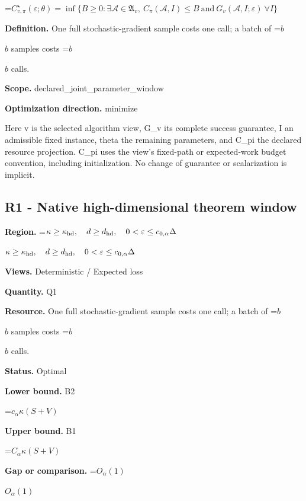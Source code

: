 \documentclass[10pt,a4paper]{article}
\newcommand{\AtlasMath}[1]{\par\begingroup\centering\setbox0=\hbox{$\displaystyle #1$}\ifdim\wd0>1.4\linewidth\typeout{ATLAS WIDE FORMULA: \the\wd0}\fi\ifdim\wd0>\linewidth\resizebox{\linewidth}{!}{\box0}\else\box0\fi\par\endgroup}
\newcommand{\AtlasInlineMath}[1]{\begingroup\setbox0=\hbox{$#1$}\ifdim\wd0>.4\linewidth\endgroup\AtlasMath{#1}\else\endgroup$#1$\fi}
\begin{document}
\AtlasMath{C^\star_{v,\pi}(\varepsilon;\theta)=\inf\{B\ge0:\exists\mathcal A\in\mathfrak A_v,\ C_\pi(\mathcal A,I)\le B\ \text{and}\ G_v(\mathcal A,I;\varepsilon)\ \forall I\}}


\textbf{Definition.} One full stochastic-gradient sample costs one call; a batch of \AtlasInlineMath{b} samples costs \AtlasInlineMath{b} calls.



\textbf{Scope.} declared\_joint\_parameter\_window



\textbf{Optimization direction.} minimize



Here v is the selected algorithm view, G\_v its complete success guarantee, I an admissible fixed instance, theta the remaining parameters, and C\_pi the declared resource projection. C\_pi uses the view's fixed-path or expected-work budget convention, including initialization. No change of guarantee or scalarization is implicit.



\subsection{R1 - Native high-dimensional theorem window}


\textbf{Region.} \AtlasInlineMath{\kappa\ge\kappa_{\rm hd},\quad d\ge d_{\rm hd},\quad0<\varepsilon\le c_{0,\alpha}\Delta}



\textbf{Views.} Deterministic / Expected loss



\textbf{Quantity.} Q1



\textbf{Resource.} One full stochastic-gradient sample costs one call; a batch of \AtlasInlineMath{b} samples costs \AtlasInlineMath{b} calls.



\textbf{Status.} Optimal



\textbf{Lower bound.} B2



\AtlasMath{c_\alpha\kappa(S+V)}


\textbf{Upper bound.} B1



\AtlasMath{C_\alpha\kappa(S+V)}


\textbf{Gap or comparison.} \AtlasInlineMath{O_\alpha(1)}
\end{document}
